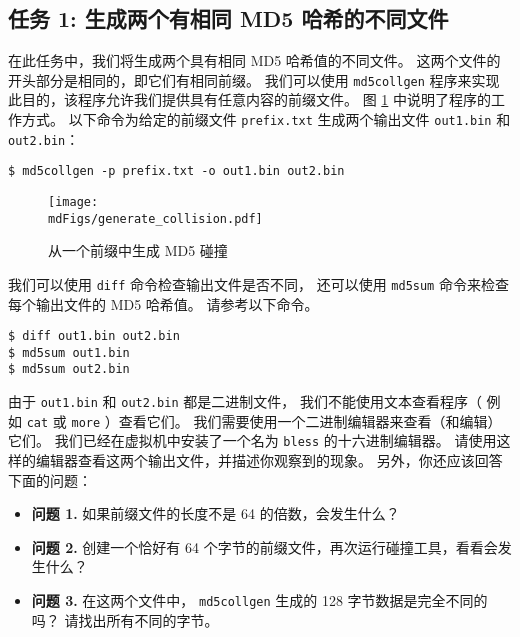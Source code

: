 \subsection{任务 1: 生成两个有相同 MD5 哈希的不同文件}


在此任务中，我们将生成两个具有相同 MD5 哈希值的不同文件。
这两个文件的开头部分是相同的，即它们有相同前缀。
我们可以使用 \texttt{md5collgen} 程序来实现此目的，该程序允许我们提供具有任意内容的前缀文件。
图 \ref{md5:fig:md5collgen} 中说明了程序的工作方式。
以下命令为给定的前缀文件 \texttt{prefix.txt} 生成两个输出文件
\texttt{out1.bin} 和 \texttt{out2.bin}：

\begin{lstlisting}
$ md5collgen -p prefix.txt -o out1.bin out2.bin
\end{lstlisting}


\begin{figure}[htb]
	\centering
	\texttt{[image: \\mdFigs/generate\_collision.pdf]}
	\caption{从一个前缀中生成 MD5 碰撞}
	\label{md5:fig:md5collgen}
\end{figure}


我们可以使用 \texttt{diff} 命令检查输出文件是否不同，
还可以使用 \texttt{md5sum} 命令来检查每个输出文件的 MD5 哈希值。
请参考以下命令。

\begin{lstlisting}
$ diff out1.bin out2.bin
$ md5sum out1.bin
$ md5sum out2.bin
\end{lstlisting}

由于 \texttt{out1.bin} 和 \texttt{out2.bin} 都是二进制文件，
我们不能使用文本查看程序（ 例如 \texttt{cat} 或 \texttt{more} ）查看它们。
我们需要使用一个二进制编辑器来查看（和编辑）它们。
我们已经在虚拟机中安装了一个名为 \texttt{bless} 的十六进制编辑器。
请使用这样的编辑器查看这两个输出文件，并描述你观察到的现象。
另外，你还应该回答下面的问题：


\begin{itemize}[label={--}]
  \item \textbf{问题 1.}
        如果前缀文件的长度不是 64 的倍数，会发生什么？

  \item \textbf{问题 2.}
        创建一个恰好有 64 个字节的前缀文件，再次运行碰撞工具，看看会发生什么？

  \item \textbf{问题 3.}
        在这两个文件中， \texttt{md5collgen} 生成的 128 字节数据是完全不同的吗？
        请找出所有不同的字节。
\end{itemize}


